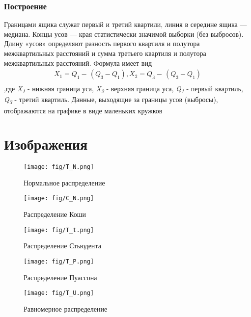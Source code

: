\subsubsection{Построение} Границами ящика служат первый и третий квартили, линия в середине ящика — медиана. Концы усов —
края статистически значимой выборки (без выбросов). Длину «усов» определяют разность первого квартиля и полутора межквартильных расстояний и сумма третьего квартиля и полутора межквартильных расстояний. Формула имеет вид \begin{gather*}
    X_1 = Q_1 - \frac{}{}(Q_3 - Q_1) ,  X_2 = Q_3 - \frac{}{}(Q_3 - Q_1) \\
\end{gather*},где \textit{X\textsubscript{1}} - нижняя граница уса, \textit{X\textsubscript{2}} - верхняя граница уса, \textit{Q\textsubscript{1}} - первый квартиль, \textit{Q\textsubscript{3}} - третий квартиль. Данные, выходящие за границы усов (выбросы), отображаются на графике в виде маленьких кружков

\section{Изображения}


    \begin{figure}
        \centering
        \texttt{[image: fig/T\_N.png]}
        \caption{Нормальное распределение}
        \label{fig:enter-label}
    \end{figure}

    \begin{figure}
        \centering
        \texttt{[image: fig/C\_N.png]}
        \caption{Распределение Коши}
        \label{fig:enter-label}
    \end{figure}

    \begin{figure}
        \centering
        \texttt{[image: fig/T\_t.png]}
        \caption{Распределение Стьюдента}
        \label{fig:enter-label}
    \end{figure}

    \begin{figure}
        \centering
        \texttt{[image: fig/T\_P.png]}
        \caption{Распределение Пуассона}
        \label{fig:enter-label}
    \end{figure}

    \begin{figure}
        \centering
        \texttt{[image: fig/T\_U.png]}
        \caption{Равномерное распределение}
        \label{fig:enter-label}
    \end{figure}